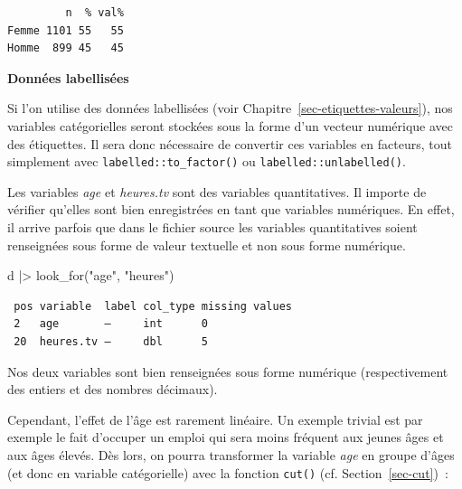 \documentclass[
  letterpaper,
  DIV=11,
  numbers=noendperiod,
  oneside]{scrreprt}
\newenvironment{Shaded}{\begin{snugshade}}{\end{snugshade}}
\newcommand{\FunctionTok}[1]{\textcolor[rgb]{0.28,0.35,0.67}{#1}}
\newcommand{\NormalTok}[1]{\textcolor[rgb]{0.00,0.23,0.31}{#1}}
\newcommand{\SpecialCharTok}[1]{\textcolor[rgb]{0.37,0.37,0.37}{#1}}
\newcommand{\StringTok}[1]{\textcolor[rgb]{0.13,0.47,0.30}{#1}}
\begin{document}
\begin{verbatim}
         n  % val%
Femme 1101 55   55
Homme  899 45   45
\end{verbatim}

\textbf{Données labellisées}

Si l'on utilise des données labellisées (voir
Chapitre~\ref{sec-etiquettes-valeurs}), nos variables catégorielles
seront stockées sous la forme d'un vecteur numérique avec des
étiquettes. Il sera donc nécessaire de convertir ces variables en
facteurs, tout simplement avec \texttt{labelled::to\_factor()} ou
\texttt{labelled::unlabelled()}.

Les variables \emph{age} et \emph{heures.tv} sont des variables
quantitatives. Il importe de vérifier qu'elles sont bien enregistrées en
tant que variables numériques. En effet, il arrive parfois que dans le
fichier source les variables quantitatives soient renseignées sous forme
de valeur textuelle et non sous forme numérique.

\begin{Shaded}
\begin{Highlighting}[]
\NormalTok{d }\SpecialCharTok{|\textgreater{}} \FunctionTok{look\_for}\NormalTok{(}\StringTok{"age"}\NormalTok{, }\StringTok{"heures"}\NormalTok{)}
\end{Highlighting}
\end{Shaded}

\begin{verbatim}
 pos variable  label col_type missing values
 2   age       —     int      0             
 20  heures.tv —     dbl      5             
\end{verbatim}

Nos deux variables sont bien renseignées sous forme numérique
(respectivement des entiers et des nombres décimaux).

Cependant, l'effet de l'âge est rarement linéaire. Un exemple trivial
est par exemple le fait d'occuper un emploi qui sera moins fréquent aux
jeunes âges et aux âges élevés. Dès lors, on pourra transformer la
variable \emph{age} en groupe d'âges (et donc en variable catégorielle)
avec la fonction \texttt{cut()} (cf. Section~\ref{sec-cut})~:
\end{document}
